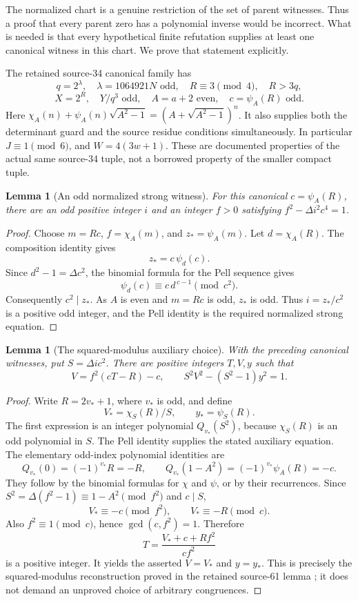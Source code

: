 \documentclass[11pt]{article}
\newtheorem{lemma}[theorem]{Lemma}
\theoremstyle{remark}
\begin{document}
The normalized chart is a genuine restriction of the set of parent
witnesses. Thus a proof that every parent zero has a polynomial inverse
would be incorrect. What is needed is that every hypothetical finite
refutation supplies at least one canonical witness in this chart.
We prove that statement explicitly.

The retained source-34 canonical family has
\[
 q=2^\lambda,\quad \lambda=1064921N\text{ odd},\quad
 R\equiv3\pmod4,\quad R>3q,
\]
\[
 X=2^R,\quad Y/q^3\text{ odd},\quad
 A=a+2\text{ even},\quad c=\psi_A(R)\text{ odd}.
\]
Here \(\chi_A(n)+\psi_A(n)\sqrt{A^2-1}
=(A+\sqrt{A^2-1})^n\).
It also supplies both the determinant guard and the source residue
conditions simultaneously. In particular \(J\equiv1\pmod6\),
and \(W=4(3w+1)\).
These are documented properties of the actual same source-34 tuple,
not a borrowed property of the smaller compact tuple.

\begin{lemma}[An odd normalized strong witness]\label{lem:strongcomplete}
For this canonical \(c=\psi_A(R)\), there are an odd positive integer \(i\)
and an integer \(f>0\) satisfying \(f^2-\Delta i^2c^4=1\).
\end{lemma}
\begin{proof}
Choose \(m=Rc\), \(f=\chi_A(m)\), and \(z_*=\psi_A(m)\).
Let \(d=\chi_A(R)\). The composition identity gives
\[
 z_*=c\,\psi_d(c).
\]
Since \(d^2-1=\Delta c^2\), the binomial formula for the Pell sequence
gives
\[
 \psi_d(c)\equiv c\,d^{\,c-1}\pmod{c^2}.
\]
Consequently \(c^2\mid z_*\).
As \(A\) is even and \(m=Rc\) is odd, \(z_*\) is odd.
Thus \(i=z_*/c^2\) is a positive odd integer, and the Pell identity
is the required normalized strong equation.
\end{proof}

\begin{lemma}[The squared-modulus auxiliary choice]\label{lem:auxcomplete}
With the preceding canonical witnesses, put \(S=\Delta i c^2\).
There are positive integers \(T,V,y\) such that
\[
 V=f^2(cT-R)-c,\qquad S^2V^2-(S^2-1)y^2=1.
\]
\end{lemma}
\begin{proof}
Write \(R=2v_*+1\), where \(v_*\) is odd, and define
\[
 V_*=\chi_S(R)/S,\qquad y_*=\psi_S(R).
\]
The first expression is an integer polynomial \(Q_{v_*}(S^2)\), because
\(\chi_S(R)\) is an odd polynomial in \(S\). The Pell identity supplies
the stated auxiliary equation. The elementary odd-index polynomial
identities are
\[
 Q_{v_*}(0)=(-1)^{v_*}R=-R,\qquad
 Q_{v_*}(1-A^2)=(-1)^{v_*}\psi_A(R)=-c.
\]
They follow by the binomial formulas for \(\chi\) and \(\psi\), or by
their recurrences. Since
\(S^2=\Delta(f^2-1)\equiv1-A^2\pmod{f^2}\) and \(c\mid S\),
\[
 V_*\equiv-c\pmod{f^2},\qquad V_*\equiv-R\pmod c.
\]
Also \(f^2\equiv1\pmod c\), hence \(\gcd(c,f^2)=1\).
Therefore
\[
 T=\frac{V_*+c+Rf^2}{cf^2}
\]
is a positive integer. It yields the asserted \(V=V_*\) and \(y=y_*\).
This is precisely the squared-modulus reconstruction proved in the
retained source-61 lemma \cite{source61}; it does not demand an
unproved choice of arbitrary congruences.
\end{proof}
\end{document}
